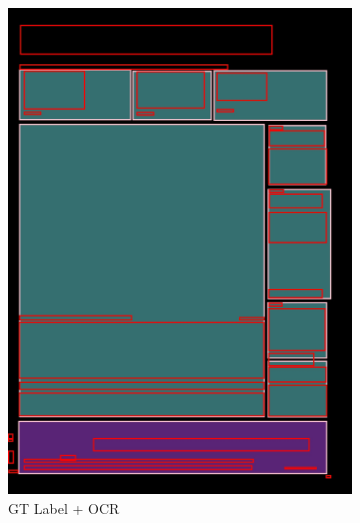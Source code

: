 \documentclass[aspectratio=1610]{beamer}
\begin{document}
\begin{frame}
\begin{figure}
\begin{subfigure}{.25\textwidth}
  \includegraphics[width=0.99\linewidth, clip=true, trim = 0mm 0mm 0mm 0mm]{figures/ocr_bbox/JIefsDa.jpg}
  \caption{GT Label + OCR}
\end{subfigure}%
\begin{subfigure}{.25\textwidth}
  \centering

\end{subfigure}
\end{figure}
\end{frame}
\end{document}
